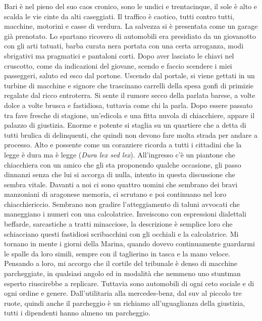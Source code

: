 Bari è nel pieno del suo caos cronico, sono le undici e trentacinque, il sole è alto e scalda le vie cinte da alti caseggiati. Il traffico è caotico, tutti contro tutti, macchine, motorini e casse di verdura. La salvezza si è presentata come un garage già prenotato. Lo spartano ricovero di automobili era presidiato da un giovanotto con gli arti tatuati, barba curata nera portata con una certa arroganza, modi sbrigativi ma pragmatici e pantaloni corti. Dopo aver lasciato le chiavi nel cruscotto, come da indicazioni del giovane, scendo e faccio scendere i miei passeggeri, saluto ed esco dal portone.\newline
Uscendo dal portale, si viene gettati in un turbine di macchine e signore che trascinano carrelli della spesa gonfi di primizie regalate dal ricco entroterra. Si sente il rumore secco della parlata barese, a volte dolce a volte brusca e fastidiosa, tuttavia come chi la parla. Dopo essere passato tra fave fresche di stagione, un'edicola e una fitta nuvola di chiacchiere, appare il palazzo di giustizia. Enorme e potente si staglia su un quartiere che a detta di tutti brulica di delinquenti, che quindi non devono fare molta strada per andare a processo. Alto e possente come un corazziere ricorda a tutti i cittadini che la legge è dura ma è legge (\emph{Dura lex sed lex}).\newline
All'ingresso c'è un piantone che chiacchiera con un amico che gli sta proponendo qualche occasione, gli passo dinnanzi senza che lui si accorga di nulla, intento in questa discussione che sembra vitale. Davanti a noi ci sono quattro uomini che sembrano dei bravi manzoniani di aragonese memoria, ci scrutano e poi continuano nel loro chiacchiericcio. Sembrano non gradire l'atteggiamento di taluni avvocati che maneggiano i numeri con una calcolatrice. Inveiscono con espressioni dialettali beffarde, sarcastiche a tratti minacciose, la descrizione è semplice loro che schiacciano questi fastidiosi scribacchini con gli occhiali e la calcolatrice. Mi tornano in mente i giorni della Marina, quando dovevo continuamente guardarmi le spalle da loro simili, sempre con il taglierino in tasca e la mano veloce. Pensando a loro, mi accorgo che il cortile del tribunale è denso di macchine parcheggiate, in qualsiasi angolo ed in modalità che nemmeno uno stuntman esperto riuscirebbe a replicare. Tuttavia sono automobili di ogni ceto sociale e di ogni ordine e genere. Dall'utilitaria alla mercedes-benz, dal suv al piccolo tre ruote, quindi anche il parcheggio è un richiamo all'uguaglianza della giustizia, tutti i dipendenti hanno almeno un parcheggio.\newline
